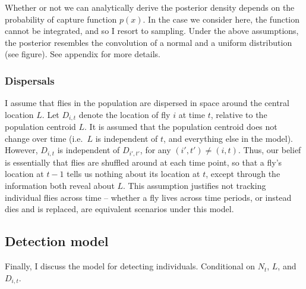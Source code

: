 \documentclass[
]{book}
\begin{document}
Whether or not we can analytically derive the posterior density depends on the probability of capture function \(p(x)\). In the case we consider here, the function cannot be integrated, and so I resort to sampling. Under the above assumptions, the posterior resembles the convolution of a normal and a uniform distribution (see figure). See appendix for more details.

\hypertarget{dispersals}{%
\subsubsection{Dispersals}\label{dispersals}}

I assume that flies in the population are dispersed in space around the central location \(L\). Let \(D_{i, t}\) denote the location of fly \(i\) at time \(t\), relative to the population centroid \(L\). It is assumed that the population centroid does not change over time (i.e.~\(L\) is independent of \(t\), and everything else in the model). However, \(D_{i, t}\) is independent of \(D_{i', t'}\), for any \((i', t') \neq (i, t)\). Thus, our belief is essentially that flies are shuffled around at each time point, so that a fly's location at \(t-1\) tells us nothing about its location at \(t\), except through the information both reveal about \(L\). This assumption justifies not tracking individual flies across time -- whether a fly lives across time periods, or instead dies and is replaced, are equivalent scenarios under this model.

\hypertarget{detection-model}{%
\subsection{Detection model}\label{detection-model}}

Finally, I discuss the model for detecting individuals. Conditional on \(N_t\), \(L\), and \(D_{i, t}\).
\end{document}
